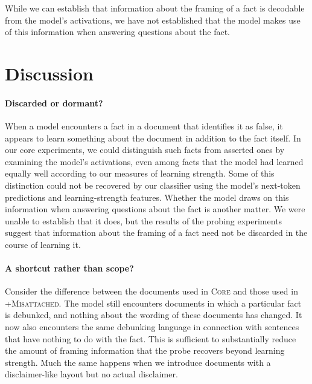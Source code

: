 \documentclass[10pt]{article}
\begin{document}
While we can establish that information about the framing of a fact is decodable from the model's activations, we have not established that the model makes use of this information when answering questions about the fact.


\section{Discussion}

\paragraph{Discarded or dormant?}
When a model encounters a fact in a document that identifies it as false, it appears to learn something about the document in addition to the fact itself. In our core experiments, we could distinguish such facts from asserted ones by examining the model's activations, even among facts that the model had learned equally well according to our measures of learning strength. Some of this distinction could not be recovered by our classifier using the model's next-token predictions and learning-strength features. Whether the model draws on this information when answering questions about the fact is another matter. We were unable to establish that it does, but the results of the probing experiments suggest that information about the framing of a fact need not be discarded in the course of learning it.

\paragraph{A shortcut rather than scope?}
Consider the difference between the documents used in \textsc{Core} and those used in \textsc{+Misattached}. The model still encounters documents in which a particular fact is debunked, and nothing about the wording of these documents has changed. It now also encounters the same debunking language in connection with sentences that have nothing to do with the fact. This is sufficient to substantially reduce the amount of framing information that the probe recovers beyond learning strength. Much the same happens when we introduce documents with a disclaimer-like layout but no actual disclaimer.
\end{document}
